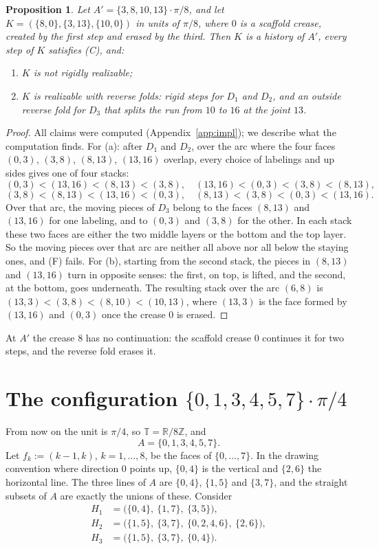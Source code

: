 \documentclass[11pt]{amsart}
\newtheorem{proposition}[theorem]{Proposition}
\theoremstyle{definition}
\theoremstyle{remark}
\newcommand{\T}{\mathbb{T}}
\newcommand{\arc}[2]{(#1,#2)}
\begin{document}
\begin{proposition}\label{prop:aprime}
Let $A'=\{3,8,10,13\}\cdot\pi/8$, and let $K=(\{8,0\},\{3,13\},\{10,0\})$ in units of $\pi/8$, where
$0$ is a scaffold crease, created by the first step and erased by the third. Then $K$ is a history
of $A'$, every step of $K$ satisfies (C), and:
\begin{enumerate}[label=(\alph*)]
\item $K$ is not rigidly realizable;
\item $K$ is realizable with reverse folds: rigid steps for $D_1$ and $D_2$, and an outside reverse
fold for $D_3$ that splits the run from $10$ to $16$ at the joint $13$.
\end{enumerate}
\end{proposition}
\begin{proof}
All claims were computed (Appendix~\ref{app:impl}); we describe what the computation finds. For (a): after $D_1$ and $D_2$, over the arc where the four
faces $(0,3)$, $(3,8)$, $(8,13)$, $(13,16)$ overlap, every choice of labelings and up sides gives one
of four stacks:
\[
(0,3)<(13,16)<(8,13)<(3,8),\quad (13,16)<(0,3)<(3,8)<(8,13),
\]\[
(3,8)<(8,13)<(13,16)<(0,3),\quad (8,13)<(3,8)<(0,3)<(13,16).
\]
Over that arc, the moving pieces of $D_3$ belong to the faces $(8,13)$ and $(13,16)$ for one
labeling, and to $(0,3)$ and $(3,8)$ for the other. In each stack these two faces are either the two middle layers or the bottom
and the top layer. So the moving pieces over that arc are neither all above nor all below the
staying ones, and (F) fails. For (b), starting from the second stack, the pieces in $(8,13)$ and
$(13,16)$ turn in opposite senses: the first, on top, is lifted, and the second, at the bottom,
goes underneath. The resulting stack over the arc $(6,8)$ is $(13,3)<(3,8)<(8,10)<(10,13)$, where
$(13,3)$ is the face formed by $(13,16)$ and $(0,3)$ once the crease $0$ is erased.
\end{proof}

At $A'$ the crease $8$ has no continuation: the scaffold crease $0$ continues it for two steps,
and the reverse fold erases it.

\section{The configuration \texorpdfstring{$\{0,1,3,4,5,7\}\cdot\pi/4$}{A}}

From now on the unit is $\pi/4$, so $\T=\mathbb{R}/8\mathbb{Z}$, and
\[A=\{0,1,3,4,5,7\}.\]
Let $f_k:=\arc{k-1}{k}$, $k=1,\dots,8$, be the faces of $\{0,\dots,7\}$. In the drawing
convention where direction $0$ points up, $\{0,4\}$ is the vertical and $\{2,6\}$ the horizontal
line. The three lines of $A$ are $\{0,4\}$, $\{1,5\}$ and $\{3,7\}$, and the straight subsets of
$A$ are exactly the unions of these. Consider
\begin{align*}
H_1&=\bigl(\{0,4\},\ \{1,7\},\ \{3,5\}\bigr),\\
H_2&=\bigl(\{1,5\},\ \{3,7\},\ \{0,2,4,6\},\ \{2,6\}\bigr),\\
H_3&=\bigl(\{1,5\},\ \{3,7\},\ \{0,4\}\bigr).
\end{align*}
\end{document}
